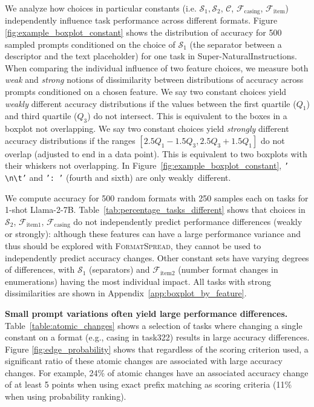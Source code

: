 \documentclass{article} %
\newcommand{\tbdone}[1]{}
\renewcommand{\tbdone}[1]{{\color{black}{#1}}}  %
\newcommand{\prompt}[1]{{\small{\texttt{#1}}}}
\renewcommand{\paragraph}[1]{\textbf{#1}}
\newcommand{\toolname}[1]{}
\renewcommand{\toolname}[1]{{\color{black} \textsc{FormatSpread}}}
\begin{document}
We analyze how choices in particular constants (i.e. $\mathcal{S}_1, \mathcal{S}_2$, $\mathcal{C}$, $\mathcal{F}_\text{casing}$, $\mathcal{F}_\text{item}$) independently influence task performance across different formats.
Figure \ref{fig:example_boxplot_constant} shows the distribution of accuracy for 500 sampled prompts conditioned on the choice of $\mathcal{S}_1$ (the separator between a descriptor and the text placeholder) for one task in Super-NaturalInstructions.
When comparing the individual influence of two feature choices, we measure both \textit{weak} and \textit{strong} notions of dissimilarity between distributions of accuracy across prompts conditioned on a chosen feature.
We say two constant choices yield \textit{weakly} different accuracy distributions if the values between the first quartile ($Q_1$) and third quartile ($Q_3$) do not intersect. 
This is equivalent to the boxes in a boxplot not overlapping. 
We say two constant choices yield \textit{strongly} different accuracy distributions if the ranges $[2.5Q_1 - 1.5Q_3, 2.5Q_3 + 1.5Q_1]$ do not overlap (adjusted to end in a data point).
This is equivalent to two boxplots with their whiskers not overlapping. 
In Figure~\ref{fig:example_boxplot_constant}, \prompt{' \textbackslash n\textbackslash t'} and \prompt{': '} (fourth and sixth) are only weakly~different.

We compute accuracy for 500 random formats with 250 samples each on \tbdone{31} tasks for 1-shot Llama-2-7B. 
Table~\ref{tab:percentage_tasks_different} shows that choices in $\mathcal{S}_2$, $\mathcal{F}_\text{item1}$, $\mathcal{F}_\text{casing}$ do not independently predict performance differences (weakly or strongly): although these features can have a large performance variance and thus should be explored with \toolname{}, they cannot be used to independently predict accuracy changes. 
Other constant sets have varying degrees of differences, 
with $\mathcal{S}_{1}$ (separators) and $\mathcal{F}_\text{item2}$ (number format changes in enumerations) having the most individual impact.
All tasks with strong dissimilarities are shown in Appendix~\ref{app:boxplot_by_feature}. 


\paragraph{Small prompt variations often yield large performance differences.}\label{sec:edges}
Table~\ref{table:atomic_changes} shows a selection of tasks where changing a single constant on a format (e.g., casing in task322) results in large accuracy differences. %
Figure \ref{fig:edge_probability} shows that regardless of the scoring criterion used, a significant ratio of these atomic changes are associated with large accuracy changes. 
For example, 24\% of atomic changes have an associated accuracy change of at least 5 points when using exact prefix matching as scoring criteria (11\% when using probability ranking).  %
\end{document}
